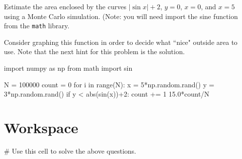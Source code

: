 \documentclass{ximera}
\begin{document}
\begin{question}
Estimate the area enclosed by the curves $|\sin{x}|+2$, $y=0$, $x=0$, and $x=5$ using a Monte Carlo simulation. (Note: you will need import the sine function from the \verb|math| library.
\begin{hint}
Consider graphing this function in order to decide what ``nice" outside area to use. Note that the next hint for this problem is the solution.
\end{hint}
	\begin{hint}
\begin{sageCell}
import numpy as np
from math import sin

N = 100000
count = 0
for i in range(N):
        x = 5*np.random.rand()
        y = 3*np.random.rand()
        if y < abs(sin(x))+2:
                count += 1
15.0*count/N
\end{sageCell}
	\end{hint}
\end{question}

\section{Workspace}

\begin{sageCell}
# Use this cell to solve the above questions.
\end{sageCell}
\end{document}
